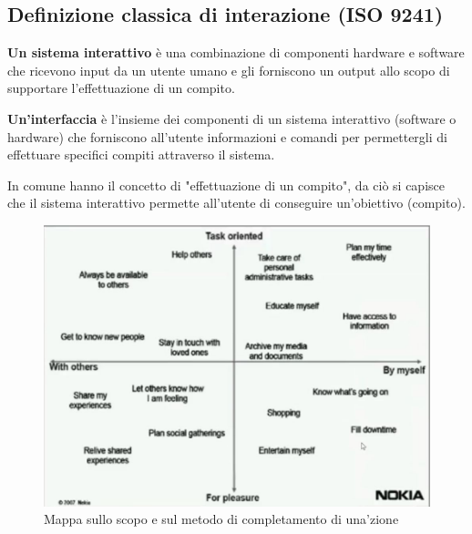 \documentclass[11pt,a4paper]{book}
\begin{document}
\subsection{Definizione classica di interazione (ISO 9241)}
\textbf{Un sistema interattivo} è una combinazione di componenti hardware e software che ricevono input da un utente umano e gli forniscono un output allo scopo di supportare l'effettuazione di un compito.

\textbf{Un'interfaccia} è l'insieme dei componenti di un sistema interattivo (software o hardware) che forniscono all'utente informazioni e comandi per permettergli di effettuare specifici compiti attraverso il sistema.

In comune hanno il concetto di "effettuazione di un compito", da ciò si capisce che il sistema interattivo permette all'utente di conseguire un'obiettivo (compito).

\begin{figure}[h!]
	\begin{center}
		\includegraphics[scale=0.6]{img/003.jpg}
		\caption{Mappa sullo scopo e sul metodo di completamento di una'zione}
		\label{fig: 003}
	\end{center}
\end{figure}
\end{document}
